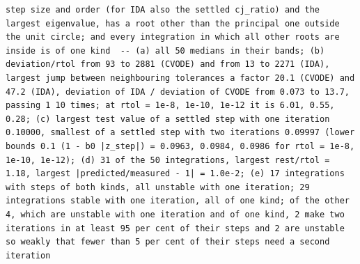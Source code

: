 \documentclass[
  10pt,
]{article}
\begin{document}
\begin{verbatim}
step size and order (for IDA also the settled cj_ratio) and the largest eigenvalue, has a root other than the principal one outside the unit circle; and every integration in which all other roots are inside is of one kind  -- (a) all 50 medians in their bands; (b) deviation/rtol from 93 to 2881 (CVODE) and from 13 to 2271 (IDA), largest jump between neighbouring tolerances a factor 20.1 (CVODE) and 47.2 (IDA), deviation of IDA / deviation of CVODE from 0.073 to 13.7, passing 1 10 times; at rtol = 1e-8, 1e-10, 1e-12 it is 6.01, 0.55, 0.28; (c) largest test value of a settled step with one iteration 0.10000, smallest of a settled step with two iterations 0.09997 (lower bounds 0.1 (1 - b0 |z_step|) = 0.0963, 0.0984, 0.0986 for rtol = 1e-8, 1e-10, 1e-12); (d) 31 of the 50 integrations, largest rest/rtol = 1.18, largest |predicted/measured - 1| = 1.0e-2; (e) 17 integrations with steps of both kinds, all unstable with one iteration; 29 integrations stable with one iteration, all of one kind; of the other 4, which are unstable with one iteration and of one kind, 2 make two iterations in at least 95 per cent of their steps and 2 are unstable so weakly that fewer than 5 per cent of their steps need a second iteration

\end{verbatim}
\end{document}
